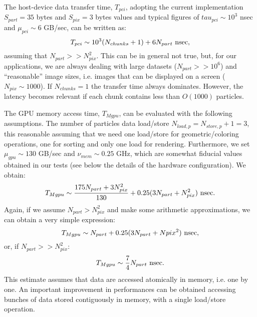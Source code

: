 \documentclass[11pt]{article}
\begin{document}
The host-device data transfer time, $T_{pci}$, adopting the current implementation 
$S_{part} = 35$ bytes and $S_{pix} = 3$ bytes values and typical figures of 
$tau_{pci} \sim 10^3$ nsec and $\mu_{pci} \sim 6$ GB/sec, can be written as:
\begin{equation}
T_{pci} \sim 10^3(N_{chunks} + 1) + 6 N_{part}\ {\rm nsec},
\end{equation}
assuming that $N_{part} >> N_{pix}^2$. This can be in general not true, but, 
for our applications, we are always dealing with large datasets
($N_{part} >> 10^6$) and ``reasonable'' image sizes, i.e. images that can be 
displayed on a screen ($N_{pix} \sim 1000$). If $N_{chunks} = 1$ the transfer 
time always dominates. However, the latency becomes relevant if each
chunk contains less than $O(1000)$ particles. 

The GPU memory access time, $T_{Mgpu}$, can be evaluated with the 
following assumptions. The number of particles data load/store $N_{load,p} = 
N_{store,p}+1 = 3$, this reasonable assuming that we need one load/store
for geometric/coloring operations, one for sorting and only one load
for rendering. Furthermore, we 
set $\mu_{gpu} \sim 130$ GB/sec and $\nu_{mem} \sim 0.25$ GHz, which are somewhat
fiducial values obtained in our tests (see below the details of the 
hardware configuration). We obtain:
\begin{equation}
T_{Mgpu} \sim {175 N_{part} + 3 N_{pix}^2\over 130} + 0.25 (3 N_{part} + N_{pix}^2)\ {\rm nsec}.
\end{equation}
Again, if we assume $N_{part} > N_{pix}^2$ and make some arithmetic approximations,
we can obtain a very simple expression:
\begin{equation}
T_{Mgpu} \sim N_{part} + 0.25 (3 N_{part} + N{pix}^2)\ {\rm nsec},
\end{equation}
or, if $N_{part} >> N_{pix}^2$:
\begin{equation}
T_{Mgpu} \sim {7\over 4} N_{part}\ {\rm nsec}.
\end{equation}
This estimate assumes that data are accessed atomically in memory, i.e. one by one.
An important improvement in performances can be obtained accessing bunches 
of data stored contiguously in memory, with a single load/store operation.
\end{document}
